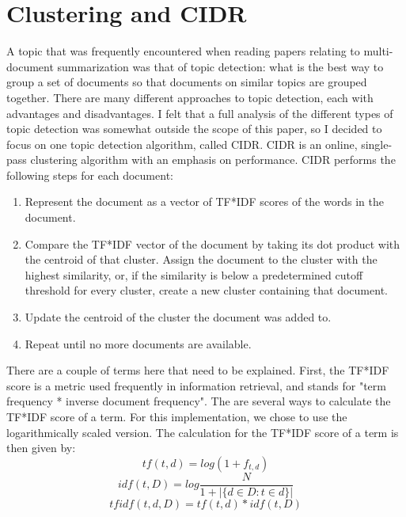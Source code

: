 \documentclass[../writeup.tex]{subfiles}
\begin{document}
\section{Clustering and CIDR}\label{sam:sec:clustering}
A topic that was frequently encountered when reading papers relating to multi-document summarization was that of topic detection: what is the best way to group a set of documents so that documents on similar topics are grouped together.
There are many different approaches to topic detection, each with advantages and disadvantages.
I felt that a full analysis of the different types of topic detection was somewhat outside the scope of this paper, so I decided to focus on one topic detection algorithm, called CIDR.
CIDR is an online, single-pass clustering algorithm with an emphasis on performance.\autocite*[]{cidr-clustering}
CIDR performs the following steps for each document:
\begin{enumerate}
    \item Represent the document as a vector of TF*IDF scores of the words in the document.
    \item Compare the TF*IDF vector of the document by taking its dot product with the centroid of that cluster. Assign the document to the cluster with the highest similarity, or, if the similarity is below a predetermined cutoff threshold for every cluster, create a new cluster containing that document.
    \item Update the centroid of the cluster the document was added to.
    \item Repeat until no more documents are available.
\end{enumerate}

There are a couple of terms here that need to be explained.
First, the TF*IDF score is a metric used frequently in information retrieval, and stands for "term frequency * inverse document frequency".
The are several ways to calculate the TF*IDF score of a term. For this implementation, we chose to use the logarithmically scaled version.
The calculation for the TF*IDF score of a term is then given by:
\begin{equation}\label{sam:eq:tf}
    tf(t, d) = log(1+f_{t, d})
\end{equation}
\begin{equation}\label{sam:eq:idf}
    idf(t, D) = log \frac{N}{1 + |\{d \in D : t \in d\}|}
\end{equation}
\begin{equation}\label{sam:eq:tf_idf}
    tfidf(t, d, D) = tf(t, d) * idf(t, D)
\end{equation}
\end{document}
